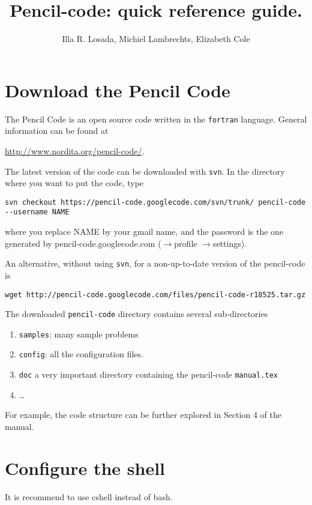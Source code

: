 \documentclass[a4paper,12pt]{article}
\title{Pencil-code: quick reference guide.}
\author{Illa R. Losada, Michiel Lambrechts, Elizabeth Cole }
\begin{document}
\maketitle

\tableofcontents

\newpage

\section{Download the Pencil Code}
The Pencil Code is an open source code written in the \verb|fortran| language. General information can be found at

\url{http://www.nordita.org/pencil-code/}.

The latest version of the code can be downloaded with \verb|svn|. In the
directory where you want to put the code, type
\begin{verbatim}
svn checkout https://pencil-code.googlecode.com/svn/trunk/ pencil-code
--username NAME
\end{verbatim}
where you replace NAME by your gmail name, and the password is the
one generated by pencil-code.googlecode.com ($\rightarrow$profile
$\rightarrow$settings). 

An alternative, without using \verb|svn|, for a non-up-to-date version of the pencil-code is
\begin{verbatim}
wget http://pencil-code.googlecode.com/files/pencil-code-r18525.tar.gz
\end{verbatim}

The downloaded \verb|pencil-code| directory contains several sub-directories
\begin{enumerate}
  \item \verb|samples|:  many sample problems
  \item \verb|config|: all the configuration files.
  \item \verb|doc| a very important directory containing the pencil-code
    \verb|manual.tex|
  \item \dots
\end{enumerate}
For example, the code structure can be further explored in Section 4 of the
manual.


\section{Configure the shell}

It is recommend to use cshell instead of bash.
\end{document}
